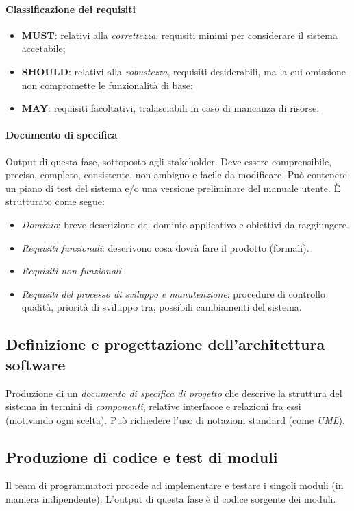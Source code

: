 \paragraph{Classificazione dei requisiti}
\begin{itemize}
    \item \textbf{MUST}: relativi alla \textit{correttezza}, requisiti minimi per considerare il sistema accetabile;
    \item \textbf{SHOULD}: relativi alla \textit{robustezza}, requisiti desiderabili, ma la cui omissione non compromette le funzionalità di base;
    \item \textbf{MAY}: requisiti facoltativi, tralasciabili in caso di mancanza di risorse.
\end{itemize}

\paragraph{Documento di specifica} Output di questa fase, sottoposto agli stakeholder. Deve essere comprensibile, preciso, completo, consistente, non ambiguo e facile da modificare. Può contenere un piano di test del sistema e/o una versione preliminare del manuale utente. È strutturato come segue:
\begin{itemize}
    \item \textit{Dominio}: breve descrizione del dominio applicativo e obiettivi da raggiungere.
    \item \textit{Requisiti funzionali}: descrivono cosa dovrà fare il prodotto (formali).
    \item \textit{Requisiti non funzionali}
    \item \textit{Requisiti del processo di sviluppo e manutenzione}: procedure di controllo qualità, priorità di sviluppo tra, possibili cambiamenti del sistema.
\end{itemize}

\subsection{Definizione e progettazione dell'architettura software}
Produzione di un \textit{documento di specifica di progetto} che descrive la struttura del sistema in termini di \textit{componenti}, relative interfacce e relazioni fra essi (motivando ogni scelta). Può richiedere l'uso di notazioni standard (come \textit{UML}).

\subsection{Produzione di codice e test di moduli}
Il team di programmatori procede ad implementare e testare i singoli moduli (in maniera indipendente). L'output di questa fase è il codice sorgente dei moduli.

